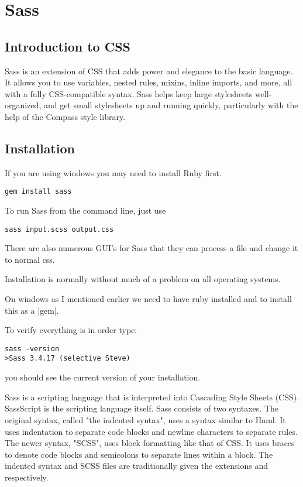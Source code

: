 \chapter{Sass}

\section{Introduction to CSS}

\ac{Sass} is an extension of CSS that adds power and elegance to the basic language. It allows you to use variables, nested rules, mixins, inline imports, and more, all with a fully CSS-compatible syntax. Sass helps keep large stylesheets well-organized, and get small stylesheets up and running quickly, particularly with the help of the Compass style library.

\section{Installation}

If you are using windows you may need to install Ruby first.

\begin{verbatim}
gem install sass
\end{verbatim}

To run Sass from the command line, just use

\begin{verbatim}
sass input.scss output.css
\end{verbatim}

There are also numerous GUI's for \ac{Sass} that they can process a file and change it to normal css.

Installation is normally without much of a problem on all operating systems.

On windows as I mentioned earlier we need to have ruby installed and to install this as a 
|gem|. 

To verify everything is in order type:

\begin{verbatim}
sass -version
>Sass 3.4.17 (selective Steve)
\end{verbatim}
\noindent you should see the current version of your installation.


Sass is a scripting language that is interpreted into Cascading Style Sheets (CSS). SassScript is the scripting language itself. Sass consists of two syntaxes. The original syntax, called "the indented syntax", uses a syntax similar to Haml. It uses indentation to separate code blocks and newline characters to separate rules. The newer syntax, "SCSS", uses block formatting like that of CSS. It uses braces to denote code blocks and semicolons to separate lines within a block. The indented syntax and SCSS files are traditionally given the extensions  and  respectively.

